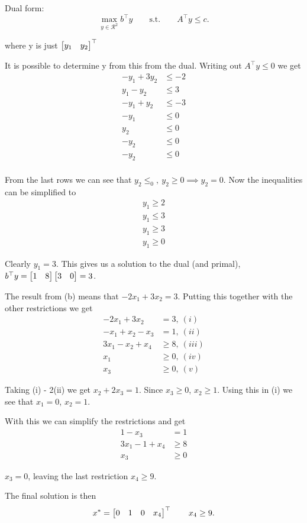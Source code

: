 
Dual form:
\[
  \max_{y\in \mathcal{R}^{2}}b^{\top}y \qquad\text{s.t.}\qquad A^{\top}y \leq c
  .\]

where y is just $\begin{bmatrix} y_1 & y_2 \end{bmatrix}^{\top}$

It is possible to determine y from this from the dual. Writing out $A^{\top}y \leq 0$ we get
\begin{align*}
  -y_1 + 3y_2 & \leq -2 \\
  y_1-y_2     & \leq 3  \\
  -y_1 + y_2  & \leq -3 \\
  -y_1        & \leq 0  \\
  y_2         & \leq 0  \\
  -y_2        & \leq 0  \\
  -y_2        & \leq 0  \\
\end{align*}

From the last rows we can see that $y_2 \leq_0 ,\ y_2 \geq 0 \implies y_2 = 0$. Now the inequalities can be simplified to 
\begin{align*}
  y_1 \geq 2 \\ 
  y_1 \leq 3 \\ 
  y_1 \geq 3 \\ 
  y_1 \geq 0
\end{align*}

Clearly $y_1 = 3$. This gives us a solution to the dual (and primal), $b^{\top}y = \begin{bmatrix} 1 & 8 \end{bmatrix}\begin{bmatrix} 3 & 0 \end{bmatrix} = 3$.


The result from (b) means that $-2x_1 +3x_2 = 3$. Putting this together with the other restrictions we get
\begin{align*}
  -2x_1+3x_2 &= 3 ,\ (i)  \\ 
  -x_1+x_2-x_3 &= 1 ,\ (ii)  \\ 
  3x_1-x_2+x_4 &\geq 8 ,\ (iii)  \\ 
  x_1 &\geq 0,\  (iv) \\ 
  x_3 &\geq 0,\ (v)
\end{align*}

Taking (i) - 2(ii) we get $x_2 + 2x_3 = 1$.  Since $x_3 \geq 0$, $x_2 \geq 1$. Using this in (i) we see that $x_1 = 0$, $x_2 = 1$.

\medskip With this we can simplify the restrictions and get
\begin{align*}
  1 - x_3 &= 1 \\ 
  3x_1 -1 + x_4 &\geq 8 \\ 
  x_3 &\geq 0
\end{align*}

$x_3 = 0$, leaving the last restriction $x_4 \geq 9$. 

The final solution is then 
\[
  x^* = \begin{bmatrix} 0 & 1 & 0 & x_4 \end{bmatrix}^{\top}\qquad x_4 \geq 9
.\] 